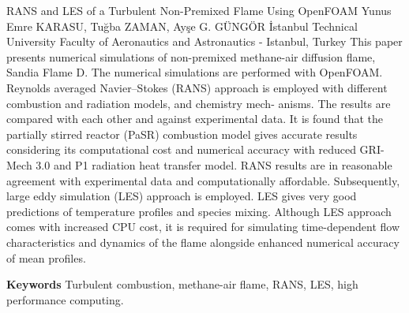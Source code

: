 
    \begin{abstract_online}{RANS and LES of a Turbulent Non-Premixed Flame Using OpenFOAM}{%
        Yunus Emre KARASU, Tuğba ZAMAN, Ayşe G. GÜNGÖR}{%
        }{%
        İstanbul Technical University Faculty of Aeronautics and Astronautics - Istanbul, Turkey}
    This paper presents numerical simulations of non-premixed methane-air diffusion flame, Sandia Flame D. The numerical simulations are performed with OpenFOAM. Reynolds averaged Navier–Stokes (RANS) approach is employed with different combustion and radiation models, and chemistry mech- anisms. The results are compared with each other and against experimental data. It is found that the partially stirred reactor (PaSR) combustion model gives accurate results considering its computational cost and numerical accuracy with reduced GRI-Mech 3.0 and P1 radiation heat transfer model. RANS results are in reasonable agreement with experimental data and computationally affordable. Subsequently, large eddy simulation (LES) approach is employed. LES gives very good predictions of temperature profiles and species mixing. Although LES approach comes with increased CPU cost, it is required for simulating time-dependent flow characteristics and dynamics of the flame alongside enhanced numerical accuracy of mean profiles. 
    
        \textbf{Keywords} \newline{}Turbulent combustion, methane-air flame, RANS, LES, high performance computing.
    \end{abstract_online}
    
